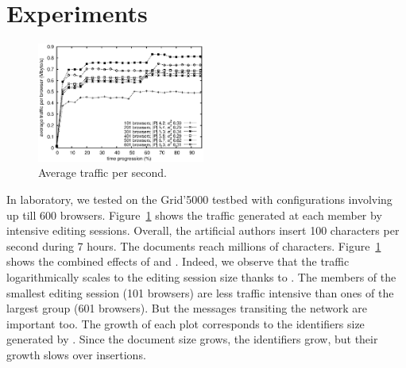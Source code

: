 
\section{Experiments}
\label{sec:live}

\begin{figure}
  \centering
  \includegraphics[width=0.49\textwidth]{img/traffic.eps}
  \caption{\label{fig:traffic}Average traffic per second.}
\end{figure}

In laboratory, we tested \CRATE on the Grid'5000 testbed with configurations
involving up till 600 browsers. Figure~\ref{fig:traffic} shows the traffic
generated at each member by intensive editing sessions. Overall, the artificial
authors insert 100 characters per second during 7 hours. The documents reach
millions of characters. Figure~\ref{fig:traffic} shows the combined effects of
\SPRAY and \LSEQ. Indeed, we observe that the traffic logarithmically scales to
the editing session size thanks to \SPRAY. The members of the smallest editing
session (101 browsers) are less traffic intensive than ones of the largest group
(601 browsers).  But the messages transiting the network are important too. The
growth of each plot corresponds to the identifiers size generated by
\LSEQ. Since the document size grows, the identifiers grow, but their growth
slows over insertions.



